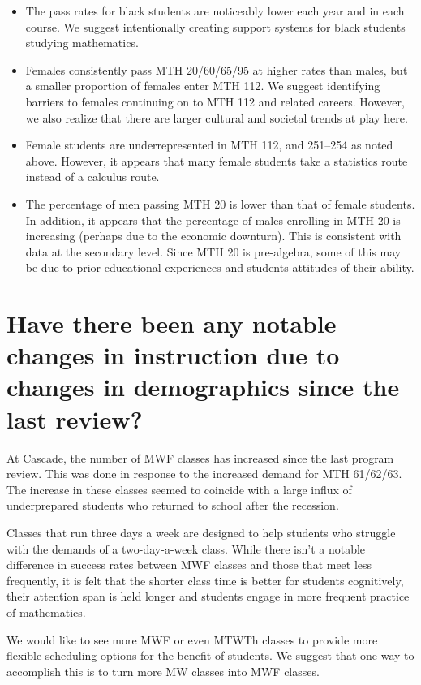 \begin{itemize}
	\item The pass rates for black students are noticeably lower each year and in each course. We suggest intentionally creating support systems for black students studying mathematics.
	\item Females consistently pass MTH 20/60/65/95 at higher rates than males, but a smaller proportion of females enter MTH 112. We suggest identifying barriers to females continuing on to MTH 112 and related careers. However, we also realize that there are larger cultural and societal trends at play here.
	\item Female students are underrepresented in MTH 112, and 251--254 as noted above. However, it appears that many female students take a statistics route instead of a calculus route.
	\item The percentage of men passing MTH 20 is lower than that of female students. In addition, it appears that the percentage of males enrolling in MTH 20 is increasing (perhaps due to the economic downturn). This is consistent with data at the secondary level. Since MTH 20 is pre-algebra, some of this may be due to prior educational experiences and students attitudes of their ability.
\end{itemize}

\section{Have there been any notable changes in instruction due to changes in demographics since the last review?}
At Cascade, the number of MWF classes has increased since the last program review. This was done in response to the increased demand for MTH 61/62/63. The increase in these classes seemed to coincide with a large influx of underprepared students who returned to school after the recession.

Classes that run three days a week are designed to help students who struggle with the demands of a two-day-a-week class.  While there isn't a notable difference in success rates between MWF classes and those that meet less frequently, it is felt that the shorter class time is better for students cognitively, their attention span is held longer and students engage in more frequent practice of mathematics.  

We would like to see more MWF or even MTWTh classes to provide more flexible scheduling options for the benefit of students. We suggest that one way to accomplish this is to turn more MW classes into MWF classes.

